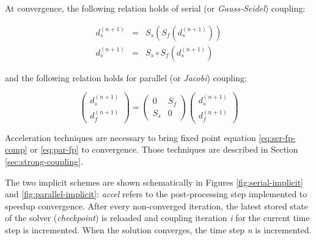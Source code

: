 At convergence, the following relation holds of serial (or \textit{Gauss-Seidel}) coupling:


\begin{subequations}
	\begin{eqnarray}
		d_s^{(n+1)} &=&  S_s\left(S_f\left(d_s^{(n+1)}\right) \right) \\
		\label{eq:ser-fp-comp}
		d_s^{(n+1)} &=& S_s  \circ S_f \left( d_s^{(n+1)} \right)
	\end{eqnarray} 
	\label{eq:ser-fp}
\end{subequations}


and the following relation holds for parallel (or \textit{Jacobi}) coupling:

\begin{equation}
	\begin{pmatrix}
		d_s^{(n+1)} \\
		d_f^{(n+1)}
	\end{pmatrix} = 
	\begin{pmatrix}
		0 & S_f \\
		S_s & 0
	\end{pmatrix} 
	\begin{pmatrix}
		d_s^{(n+1)} \\
		d_f^{(n+1)}
	\end{pmatrix}
	\label{eq:par-fp}
\end{equation}


Acceleration techniques are necessary to bring fixed point equation \ref{eq:ser-fp-comp} or \ref{eq:par-fp} to convergence. Those techniques are described in Section \ref{sec:strong-coupling}.

The two implicit schemes are shown schematically in Figures \ref{fig:serial-implicit} and \ref{fig:parallel-implicit}: \textit{accel} refers to the post-processing step implemented to speedup convergence. After every non-converged iteration, the latest stored state of the solver (\textit{checkpoint}) is reloaded and coupling iteration \textit{i} for the current time step is incremented. When the solution converges, the time step \textit{n} is incremented.


